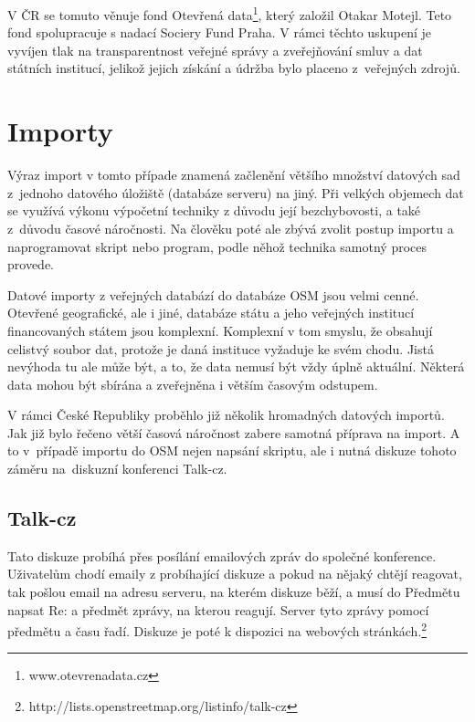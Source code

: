 V ČR se tomuto věnuje fond Otevřená data\footnote{www.otevrenadata.cz}, který založil Otakar
Motejl. Teto fond spolupracuje s nadací Sociery Fund Praha. V rámci
těchto uskupení je vyvíjen tlak na transparentnost veřejné správy a
zveřejňování smluv a dat
státních institucí, jelikož jejich získání a údržba bylo placeno
z~veřejných zdrojů.



\section{Importy}
\label{Importy}
Výraz import v tomto případe znamená začlenění většího množství datových sad 
z~jednoho datového úložiště (databáze serveru) na jiný. Při velkých objemech dat
se využívá výkonu výpočetní techniky z důvodu její bezchybovosti, a také 
z~důvodu časové náročnosti. Na člověku poté ale zbývá zvolit postup importu
a naprogramovat skript nebo program, podle něhož technika samotný proces 
provede. 

Datové importy z veřejných databází do databáze OSM jsou velmi cenné. 
Otevřené geografické, ale i jiné, databáze státu a jeho veřejných institucí 
financovaných státem jsou komplexní. Komplexní v tom smyslu, že obsahují celistvý
soubor dat, protože je daná instituce vyžaduje ke svém chodu. Jistá nevýhoda tu 
ale může být, a to, že data nemusí být vždy úplně aktuální. Některá data mohou 
být sbírána a zveřejněna i větším časovým odstupem.

V rámci České Republiky proběhlo již několik hromadných datových importů. Jak 
již bylo řečeno větší časová náročnost zabere samotná příprava na import. A to 
v~případě importu do OSM nejen napsání skriptu, ale i nutná diskuze tohoto záměru
na~diskuzní konferenci Talk-cz. 

\subsection{Talk-cz}
\label{Talk-cz}
Tato diskuze probíhá přes posílání emailových zpráv do společné konference. 
Uživatelům chodí emaily z probíhající diskuze a pokud na nějaký chtějí reagovat,
tak pošlou email na adresu serveru, na kterém diskuze běží, a musí do Předmětu 
napsat Re: a předmět zprávy, na kterou reagují. Server tyto zprávy pomocí 
předmětu a času řadí. Diskuze je poté k dispozici na webových stránkách.\footnote{http://lists.openstreetmap.org/listinfo/talk-cz}


